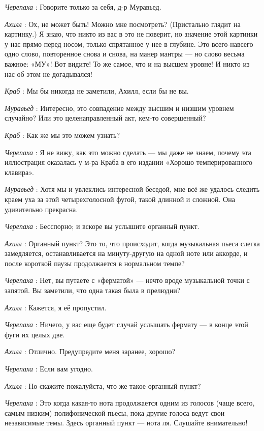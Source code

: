 \documentclass[../main.tex]{subfiles}
\begin{document}
\begin{dialogue}
\emph{Черепаха} : Говорите только за себя, д-р Муравьед.

\emph{Ахилл} : Ох, не может быть! Можно мне посмотреть? (Пристально глядит на картинку.) Я знаю, что никто из вас в это не поверит, но значение этой картинки у нас прямо перед носом, только спрятанное у нее в глубине. Это всего-навсего одно слово, повторенное снова и снова, на манер мантры --- но слово весьма важное: «МУ»! Вот видите! То же самое, что и на высшем уровне! И никто из нас об этом не догадывался!

\emph{Краб} : Мы бы никогда не заметили, Ахилл, если бы не вы.

\emph{Муравьед} : Интересно, это совпадение между высшим и низшим уровнем случайно? Или это целенаправленный акт, кем-то совершенный?

\emph{Краб} : Как же мы это можем узнать?

\emph{Черепаха} : Я не вижу, как это можно сделать --- мы даже не знаем, почему эта иллюстрация оказалась у м-ра Краба в его издании «Хорошо темперированного клавира».

\emph{Муравьед} : Хотя мы и увлеклись интересной беседой, мне всё же удалось следить краем уха за этой четырехголосной фугой, такой длинной и сложной. Она удивительно прекрасна.

\emph{Черепаха} : Бесспорно; и вскоре вы услышите органный пункт.

\emph{Ахилл} : Органный пункт? Это то, что происходит, когда музыкальная пьеса слегка замедляется, останавливается на минуту-другую на одной ноте или аккорде, и после короткой паузы продолжается в нормальном темпе?

\emph{Черепаха} : Нет, вы путаете с «ферматой» --- нечто вроде музыкальной точки с запятой. Вы заметили, что одна такая была в прелюдии?

\emph{Ахилл} : Кажется, я её пропустил.

\emph{Черепаха} : Ничего, у вас еще будет случай услышать фермату --- в конце этой фуги их целых две.

\emph{Ахилл} : Отлично. Предупредите меня заранее, хорошо?

\emph{Черепаха} : Если вам угодно.

\emph{Ахилл} : Но скажите пожалуйста, что же такое органный пункт?

\emph{Черепаха} : Это когда какая-то нота продолжается одним из голосов (чаще всего, самым низким) полифонической пьесы, пока другие голоса ведут свои независимые темы. Здесь органный пункт --- нота ля. Слушайте внимательно!


\end{dialogue}
\end{document}
